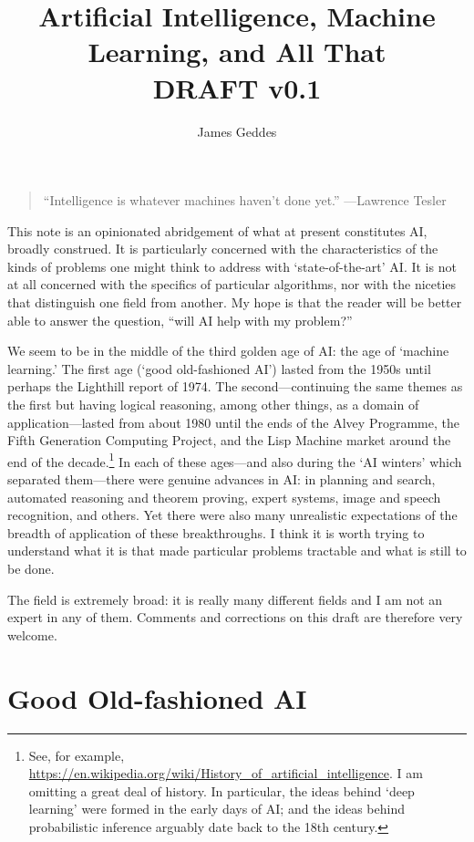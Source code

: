 \documentclass[10pt, a4paper, twocolumn]{article}
\title{Artificial Intelligence, Machine Learning, and All That \\ DRAFT v0.1}
\author{James Geddes}
\begin{document}
\maketitle
\begin{quote}
``Intelligence is whatever machines haven't done yet.'' ---Lawrence Tesler
\end{quote}
This note is an opinionated abridgement of what at present constitutes AI,
broadly construed. It is particularly concerned with the characteristics of the
kinds of problems one might think to address with `state-of-the-art' AI\@. It is
not at all concerned with the specifics of particular algorithms, nor with the
niceties that distinguish one field from another. My hope is that the reader
will be better able to answer the question, ``will AI help with my problem?''

We seem to be in the middle of the third golden age of AI: the age of `machine
learning.' The first age (`good old-fashioned AI') lasted from the 1950s until
perhaps the Lighthill report of 1974. The second---continuing the same themes as
the first but having logical reasoning, among other things, as a domain of
application---lasted from about 1980 until the ends of the Alvey Programme, the
Fifth Generation Computing Project, and the Lisp Machine market around the end
of the decade.\footnote{See, for example,
\url{https://en.wikipedia.org/wiki/History_of_artificial_intelligence}. I am
omitting a great deal of history. In particular, the ideas behind `deep
learning' were formed in the early days of AI; and the ideas behind
probabilistic inference arguably date back to the 18th century.} In each of
these ages---and also during the `AI winters' which separated them---there were
genuine advances in AI: in planning and search, automated reasoning and theorem
proving, expert systems, image and speech recognition, and others. Yet there
were also many unrealistic expectations of the breadth of application of these
breakthroughs. I think it is worth trying to understand what it is that made
particular problems tractable and what is still to be done.

The field is extremely broad: it is really many different fields and I am not an
expert in any of them. Comments and corrections on this draft are therefore very
welcome.

\section{Good Old-fashioned AI}
\end{document}
